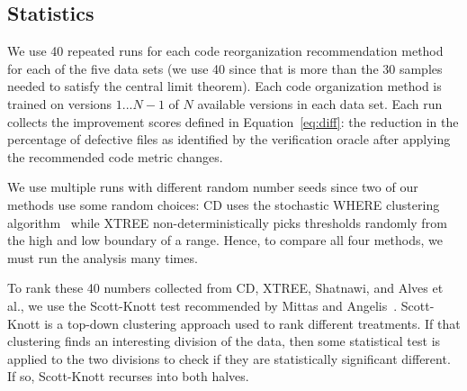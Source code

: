 \documentclass[twocolumn,5p]{elsarticle}
\newcommand{\bi}{\begin{itemize}[leftmargin=0.4cm]}
\newcommand{\ei}{\end{itemize}}
\newcommand{\eq}[1]{Equation~\ref{eq:#1}}
\theoremstyle{break}
\begin{document}
\begin{itemize}
		
		
%		
		
		\subsection{Statistics}
		
		
		We use 40 repeated runs for each code reorganization recommendation method for each of the five data sets (we use 40 since that is  more than the 30 samples  needed to satisfy the central limit theorem). Each code organization method is trained on versions $1...N-1$ of $N$ available versions in each data set.
		Each run collects the improvement scores defined in \eq{diff}: the reduction in the percentage of defective files as identified by the verification oracle after applying the recommended code metric changes.
		
		We use multiple runs with different random number seeds since two of our methods use some random choices: CD uses the  stochastic WHERE clustering algorithm~\cite{localvsglobal}
		while XTREE non-deterministically picks thresholds randomly from
		the high and low boundary of a range. 
		Hence, to compare all
		four methods, we must run the analysis many times. 
		
		
		
		
		
		To rank these 40 numbers collected from CD, XTREE, Shatnawi, and Alves et al., we use the Scott-Knott test recommended by Mittas and Angelis~\cite{mittas13}. 
		Scott-Knott is a top-down clustering approach used to rank different
		treatments. If that clustering finds an interesting division of the data, then
		some statistical test is applied to the two divisions to check if they
		are statistically significant different. If so, Scott-Knott recurses
		into both halves.
		

\end{itemize}
\end{document}
